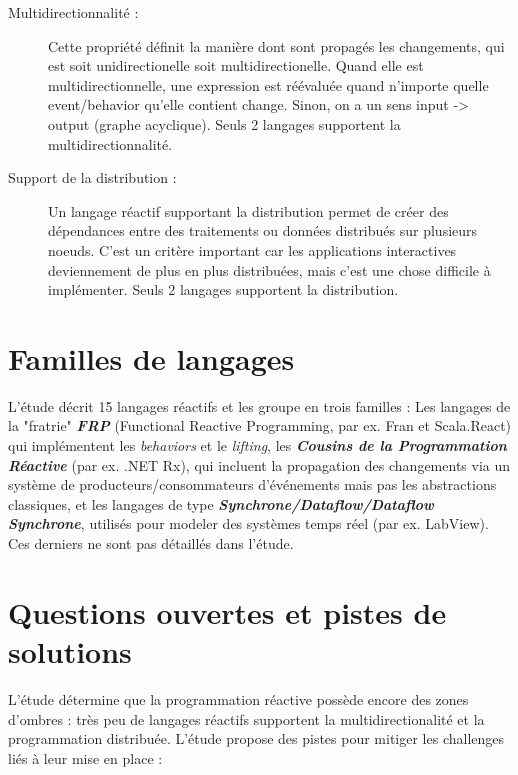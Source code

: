 \documentclass[10pt,final]{IEEEtran}
\begin{document}
\begin{description}
    \item[Multidirectionnalité :]
    Cette propriété définit la manière dont sont propagés les changements, qui est soit unidirectionelle soit multidirectionelle. Quand elle est multidirectionnelle, une expression est réévaluée quand n'importe quelle event/behavior qu'elle contient change. Sinon, on a un sens input -> output (graphe acyclique). Seuls 2 langages supportent la multidirectionnalité.
    
    \item[Support de la distribution :]
    Un langage réactif supportant la distribution permet de créer des dépendances entre des traitements ou données distribués sur plusieurs noeuds. C'est un critère important car les applications interactives deviennement de plus en plus distribuées, mais c'est une chose difficile à implémenter. Seuls 2 langages supportent la distribution.
\end{description}


\section{Familles de langages}

L'étude décrit 15 langages réactifs et les groupe en trois familles : Les langages de la "fratrie" \textit{\textbf{FRP}} (Functional Reactive Programming, par ex. Fran et Scala.React) qui implémentent les \textit{behaviors} et le \textit{lifting}, les \textit{\textbf{Cousins de la Programmation Réactive}} (par ex. .NET Rx), qui incluent la propagation des changements via un système de producteurs/consommateurs d'événements mais pas les abstractions classiques, et les langages de type \textit{\textbf{Synchrone/Dataflow/Dataflow Synchrone}}, utilisés pour modeler des systèmes temps réel (par ex. LabView). Ces derniers ne sont pas détaillés dans l'étude.

\section{Questions ouvertes et pistes de solutions}
 
L'étude détermine que la programmation réactive possède encore des zones d'ombres : très peu de langages réactifs supportent la multidirectionalité et la programmation distribuée. L'étude propose des pistes pour mitiger les challenges liés à leur mise en place :
\end{document}
